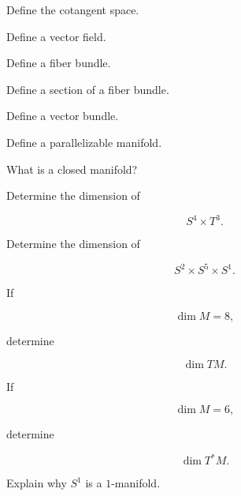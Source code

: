 \begin{exercise}[1]
Define the cotangent space.
\end{exercise}

\begin{exercise}[1]
Define a vector field.
\end{exercise}

\begin{exercise}[1]
Define a fiber bundle.
\end{exercise}

\begin{exercise}[1]
Define a section of a fiber bundle.
\end{exercise}

\begin{exercise}[1]
Define a vector bundle.
\end{exercise}

\begin{exercise}[1]
Define a parallelizable manifold.
\end{exercise}

\begin{exercise}[1]
What is a closed manifold?
\end{exercise}

\begin{exercise}[2]
Determine the dimension of

\[
S^4\times T^3.
\]
\end{exercise}

\begin{exercise}[2]
Determine the dimension of

\[
S^2\times S^5\times S^1.
\]
\end{exercise}

\begin{exercise}[2]
If

\[
\dim M=8,
\]

determine

\[
\dim TM.
\]
\end{exercise}

\begin{exercise}[2]
If

\[
\dim M=6,
\]

determine

\[
\dim T^*M.
\]
\end{exercise}

\begin{exercise}[2]
Explain why \(S^1\) is a \(1\)-manifold.
\end{exercise}

